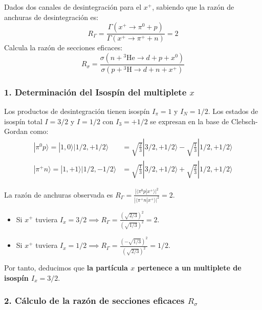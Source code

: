 \begin{problema}
Dados dos canales de desintegración para el $x^+$, sabiendo que la razón de anchuras de desintegración es:
\begin{equation*}
R_{\Gamma} = \frac{\Gamma(x^+ \rightarrow \pi^0 + p)}{\Gamma(x^+ \rightarrow \pi^+ + n)} = 2
\end{equation*}
Calcula la razón de secciones eficaces:
\begin{equation*}
R_{\sigma} = \frac{\sigma(n + {}^{3}\text{He} \rightarrow d + p + x^0)}{\sigma(p + {}^{3}\text{H} \rightarrow d + n + x^+)}
\end{equation*}

\tcblower

\subsubsection*{1. Determinación del Isospín del multiplete $x$}

Los productos de desintegración tienen isospín $I_\pi = 1$ y $I_N = 1/2$. Los estados de isospín total $I = 3/2$ y $I = 1/2$ con $I_3 = +1/2$ se expresan en la base de Clebsch-Gordan como:
\begin{align*}
|\pi^0 p\rangle = |1,0\rangle |1/2, +1/2\rangle &= \sqrt{\frac{2}{3}} |3/2, +1/2\rangle - \sqrt{\frac{1}{3}} |1/2, +1/2\rangle \\
|\pi^+ n\rangle = |1,+1\rangle |1/2, -1/2\rangle &= \sqrt{\frac{1}{3}} |3/2, +1/2\rangle + \sqrt{\frac{2}{3}} |1/2, +1/2\rangle
\end{align*}

La razón de anchuras observada es $R_\Gamma = \frac{|\langle \pi^0 p | x^+\rangle|^2}{|\langle \pi^+ n | x^+\rangle|^2} = 2$. 
\begin{itemize}
    \item Si $x^+$ tuviera $I_x = 3/2 \implies R_\Gamma = \frac{(\sqrt{2/3})^2}{(\sqrt{1/3})^2} = 2$.
    \item Si $x^+$ tuviera $I_x = 1/2 \implies R_\Gamma = \frac{(-\sqrt{1/3})^2}{(\sqrt{2/3})^2} = 1/2$.
\end{itemize}
Por tanto, deducimos que \textbf{la partícula $x$ pertenece a un multiplete de isospín $I_x = 3/2$}.

\subsubsection*{2. Cálculo de la razón de secciones eficaces $R_\sigma$}


\end{problema}
